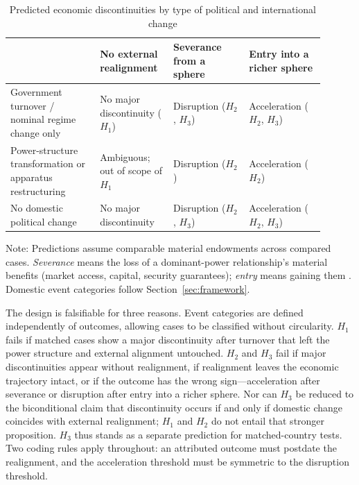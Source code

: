 \documentclass[11pt]{article}
\begin{document}
\begin{table}[htbp]
\centering
\begin{threeparttable}
\caption{Predicted economic discontinuities by type of political and international change}
\label{tab:design}
\begin{tabular}{@{}p{0.26\linewidth}p{0.20\linewidth}p{0.22\linewidth}p{0.22\linewidth}@{}}
\toprule
 & No external realignment & Severance from a sphere & Entry into a richer sphere \\
\midrule
Government turnover / nominal regime change only & No major discontinuity ($H_1$) & Disruption ($H_2$, $H_3$) & Acceleration ($H_2$, $H_3$) \\
Power-structure transformation or apparatus restructuring & Ambiguous; out of scope of $H_1$ & Disruption ($H_2$) & Acceleration ($H_2$) \\
No domestic political change & No major discontinuity & Disruption ($H_2$, $H_3$) & Acceleration ($H_2$, $H_3$) \\
\bottomrule
\end{tabular}
\begin{tablenotes}
\small
\item Note: Predictions assume comparable material endowments across compared cases. \emph{Severance} means the loss of a dominant-power relationship's material benefits (market access, capital, security guarantees); \emph{entry} means gaining them \parencite{walt_1987,keal_1983,lake_2009}. Domestic event categories follow Section~\ref{sec:framework}.
\end{tablenotes}
\end{threeparttable}
\end{table}

The design is falsifiable for three reasons. Event categories are defined independently of outcomes, allowing cases to be classified without circularity. $H_1$ fails if matched cases show a major discontinuity after turnover that left the power structure and external alignment untouched. $H_2$ and $H_3$ fail if major discontinuities appear without realignment, if realignment leaves the economic trajectory intact, or if the outcome has the wrong sign---acceleration after severance or disruption after entry into a richer sphere. Nor can $H_3$ be reduced to the biconditional claim that discontinuity occurs if and only if domestic change coincides with external realignment; $H_1$ and $H_2$ do not entail that stronger proposition. $H_3$ thus stands as a separate prediction for matched-country tests. Two coding rules apply throughout: an attributed outcome must postdate the realignment, and the acceleration threshold must be symmetric to the disruption threshold.
\end{document}
